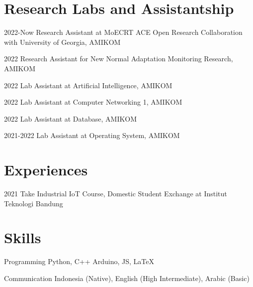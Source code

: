 \documentclass[12pt,letterpaper]{report}
\begin{document}
    \section*{Research Labs and Assistantship}
    \begin{tablist}
        \item[2022-Now]     \tab{}Research Assistant at MoECRT ACE Open Research Collaboration \\
                            \tab{}\tab{}with University of Georgia, AMIKOM \\
        \item[2022]         \tab{}\tab{}Research Assistant for New Normal Adaptation Monitoring Research, AMIKOM \\
        \item[2022]         \tab{}\tab{}Lab Assistant at Artificial Intelligence, AMIKOM \\
        \item[2022]         \tab{}\tab{}Lab Assistant at Computer Networking 1, AMIKOM \\
        \item[2022]         \tab{}\tab{}Lab Assistant at Database, AMIKOM \\
        \item[2021-2022]    \tab{}Lab Assistant at Operating System, AMIKOM \\
    \end{tablist}



    \section*{Experiences}
    \begin{tablist}
        \item[2021] \tab{}Take Industrial IoT Course, Domestic Student Exchange at Institut Teknologi Bandung
    \end{tablist}

    \section*{Skills}
    \begin{tablist}
        \item[Programming] \tab{}Python, C++ Arduino, JS, \LaTeX \\
        \item[Communication] \tab{}Indonesia (Native), English (High Intermediate), Arabic (Basic) \\
    \end{tablist}
\end{document}
